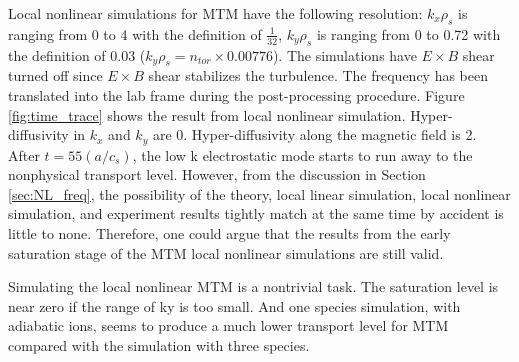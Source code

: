 \documentclass[
 aip,
 amsmath,amssymb,
 reprint
]{revtex4-1}
\begin{document}

Local nonlinear simulations for MTM have the following resolution:  $k_x\rho_s$ is ranging from 0 to 4 with the definition of $\frac{1}{32}$, $k_y\rho_s$ is ranging from 0 to 0.72 with the definition of 0.03 ($k_y\rho_s=n_{tor}\times0.00776$).  %
The simulations have $E\times B$ shear turned off since $E\times B$ shear stabilizes the turbulence. The frequency has been translated into the lab frame during the post-processing procedure. 
Figure \ref{fig:time_trace} shows the result from local nonlinear simulation. Hyper-diffusivity in $k_x$ and $k_y$ are 0.  Hyper-diffusivity along the magnetic field is 2. After $t=55 (a/c_s)$, the low k electrostatic mode starts to run away to the nonphysical transport level. However, from the discussion in Section \ref{sec:NL_freq}, the possibility of the theory, local linear simulation, local nonlinear simulation, and experiment results tightly match at the same time by accident is little to none. Therefore, one could argue that the results from the early saturation stage of the MTM local nonlinear simulations are still valid. 


Simulating the local nonlinear MTM is a nontrivial task. The saturation level is near zero if the range of ky is too small. And one species simulation, with adiabatic ions, seems to produce a much lower transport level for MTM compared with the simulation with three species. 



\end{document}
